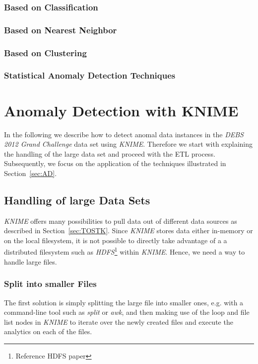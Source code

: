 \documentclass{dima}
\begin{document}
\subsubsection{Based on Classification}
\subsubsection{Based on Nearest Neighbor}
\subsubsection{Based on Clustering}
\subsubsection{Statistical Anomaly Detection Techniques}

\section{Anomaly Detection with KNIME}
\label{sec:ADwK}

In the following we describe how to detect anomal data instances in the \textit{DEBS 2012 Grand Challenge} data set using \textit{KNIME}. Therefore we start with explaining the handling of the large data set and proceed with the ETL process. Subsequently, we focus on the application of the techniques illustrated in Section~\ref{sec:AD}.

\subsection{Handling of large Data Sets}
\textit{KNIME} offers many possibilities to pull data out of different data sources as described in Section~\ref{sec:TOSTK}. Since \textit{KNIME} stores data either in-memory or on the local filesystem, it is not possible to directly take advantage of a a distributed filesystem such as \textit{HDFS}\footnote{Reference HDFS paper} within \textit{KNIME}. Hence, we need a way to handle large files.

\subsubsection{Split into smaller Files}
The first solution is simply splitting the large file into smaller ones, e.g. with a command-line tool such as \textit{split} or \textit{awk}, and then making use of the loop and file list nodes in \textit{KNIME} to iterate over the newly created files and execute the analytics on each of the files.
\end{document}
